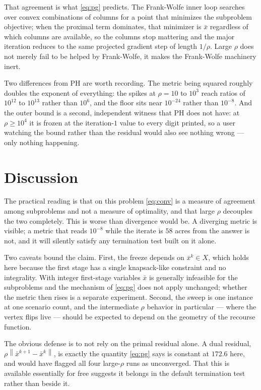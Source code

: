 \documentclass[11pt]{article}
\newcommand{\norm}[1]{\left\lVert #1 \right\rVert}
\newcommand{\xbar}{\bar{x}}
\begin{document}
That agreement is what \eqref{eq:pg} predicts.  The Frank-Wolfe inner loop
searches over convex combinations of columns for a point that minimizes the
subproblem objective; when the proximal term dominates, that minimizer is
$\xbar$ regardless of which columns are available, so the columns stop
mattering and the major iteration reduces to the same projected gradient step
of length $1/\rho$.  Large $\rho$ does not merely fail to be helped by
Frank-Wolfe, it makes the Frank-Wolfe machinery inert.

Two differences from PH are worth recording.  The metric being squared roughly
doubles the exponent of everything: the spikes at $\rho = 10$ to $10^3$ reach
ratios of $10^{12}$ to $10^{13}$ rather than $10^6$, and the floor sits near
$10^{-24}$ rather than $10^{-8}$.  And the outer bound is a second, independent
witness that PH does not have: at $\rho \ge 10^4$ it is frozen at the
iteration-$1$ value to every digit printed, so a user watching the bound rather
than the residual would also see nothing wrong --- only nothing happening.

\section{Discussion}

The practical reading is that on this problem \eqref{eq:conv} is a measure of
agreement among subproblems and not a measure of optimality, and that large
$\rho$ decouples the two completely.  This is worse than divergence would be.  A
diverging metric is visible; a metric that reads $10^{-8}$ while the iterate is
$58$ acres from the answer is not, and it will silently satisfy any termination
test built on it alone.

Two caveats bound the claim.  First, the freeze depends on $\xbar^k \in X$,
which holds here because the first stage has a single knapsack-like constraint
and no integrality.  With integer first-stage variables $\xbar$ is generally
infeasible for the subproblems and the mechanism of \eqref{eq:pg} does not
apply unchanged; whether the metric then rises is a separate experiment.
Second, the sweep is one instance at one scenario count, and the intermediate
$\rho$ behavior in particular --- where the vertex flips live --- should be
expected to depend on the geometry of the recourse function.

The obvious defense is to not rely on the primal residual alone.  A dual
residual, $\rho\norm{\xbar^{k+1} - \xbar^k}$, is exactly the quantity
\eqref{eq:pg} says is constant at $172.6$ here, and would have flagged all four
large-$\rho$ runs as unconverged.  That this is available essentially for free
suggests it belongs in the default termination test rather than beside it.
\end{document}

